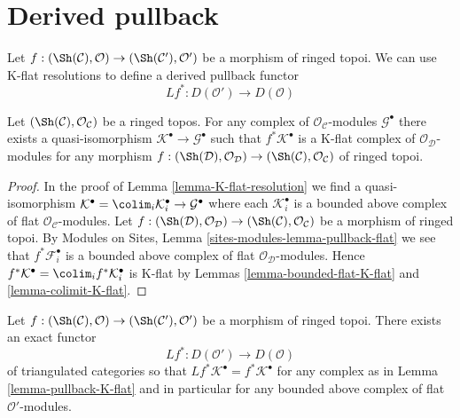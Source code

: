 \section{Derived pullback}
\label{section-derived-pullback}

\noindent
Let
$f : (\Sh(\mathcal{C}), \mathcal{O}) \to
(\Sh(\mathcal{C}'), \mathcal{O}')$
be a morphism of ringed topoi. We can use K-flat resolutions to define
a derived pullback functor
$$
Lf^* : D(\mathcal{O}') \to D(\mathcal{O})
$$

\begin{lemma}
\label{lemma-pullback-K-flat}
Let $(\Sh(\mathcal{C}), \mathcal{O}_\mathcal{C})$ be a ringed topos.
For any complex of $\mathcal{O}_\mathcal{C}$-modules $\mathcal{G}^\bullet$
there exists a quasi-isomorphism $\mathcal{K}^\bullet \to \mathcal{G}^\bullet$
such that $f^*\mathcal{K}^\bullet$ is a K-flat complex of
$\mathcal{O}_\mathcal{D}$-modules for any morphism
$f : (\Sh(\mathcal{D}), \mathcal{O}_\mathcal{D}) \to
(\Sh(\mathcal{C}), \mathcal{O}_\mathcal{C})$ of ringed topoi.
\end{lemma}

\begin{proof}
In the proof of
Lemma \ref{lemma-K-flat-resolution}
we find a quasi-isomorphism
$\mathcal{K}^\bullet = \colim_i \mathcal{K}_i^\bullet \to
\mathcal{G}^\bullet$
where each $\mathcal{K}_i^\bullet$ is a bounded above complex of
flat $\mathcal{O}_\mathcal{C}$-modules. Let
$f : (\Sh(\mathcal{D}), \mathcal{O}_\mathcal{D}) \to
(\Sh(\mathcal{C}), \mathcal{O}_\mathcal{C})$ be a morphism
of ringed topoi. By
Modules on Sites, Lemma \ref{sites-modules-lemma-pullback-flat}
we see that $f^*\mathcal{F}_i^\bullet$ is a bounded above complex
of flat $\mathcal{O}_\mathcal{D}$-modules. Hence
$f^*\mathcal{K}^\bullet  = \colim_i f^*\mathcal{K}_i^\bullet$
is K-flat by
Lemmas \ref{lemma-bounded-flat-K-flat} and \ref{lemma-colimit-K-flat}.
\end{proof}

\begin{lemma}
\label{lemma-derived-base-change}
Let
$f : (\Sh(\mathcal{C}), \mathcal{O}) \to
(\Sh(\mathcal{C}'), \mathcal{O}')$
be a morphism of ringed topoi.
There exists an exact functor
$$
Lf^* : D(\mathcal{O}') \longrightarrow D(\mathcal{O})
$$
of triangulated categories so that
$Lf^*\mathcal{K}^\bullet = f^*\mathcal{K}^\bullet$ for any complex as in
Lemma \ref{lemma-pullback-K-flat} and
in particular for any bounded above complex of flat $\mathcal{O}'$-modules.
\end{lemma}

